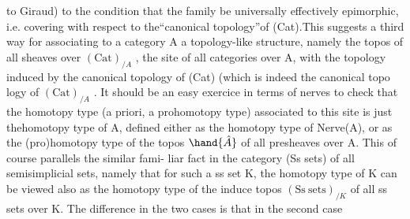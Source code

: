 to Giraud) to the condition that the family be universally effectively
epimorphic,  i.e. covering with respect to the``canonical topology''of
(Cat).This suggests a third way for associating to a \inserted{[small],} category A a
topology-like structure,  namely the topos of all sheaves over
$(\mathrm{Cat})_{/A}$  ,  the site of all categories over A,  with the topology induced
by the canonical topology of (Cat)  (which is indeed the canonical topo\hand{-}%
logy of  $(\mathrm{Cat})_{/A}$ \hand{)}.  It should be an easy exercice in terms of nerves to
check that the homotopy type (a priori,  a prohomotopy type)  associated
to this site is just thehomotopy type of A,  defined either as the
homotopy type of Nerve(A),  or as the (pro)homotopy type of the topos
$\hand{\hat{A}}$ of all presheaves over A.  This of course parallels the similar fami-%
liar fact in the category (Ss sets) of all semisimplicial sets,  namely
that for such a ss set K,  the homotopy type of K can be viewed also
as the homotopy type of the induce topos  $(\mathrm{Ss\ sets})_{/K}$ of all ss sets
over K.  The difference in the two cases is that  in the second case
